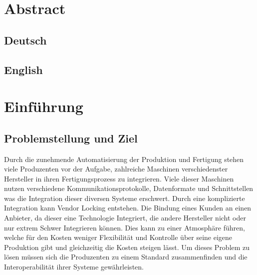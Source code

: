 \documentclass[a4paper, 12pt, oneside]{scrbook}
\begin{document}
	\frontmatter
	
	
	\tableofcontents
	\listoffigures
	\listoftables
	\nocite{*}

	\mainmatter
	
	\chapter*{Abstract}
	
	\section*{Deutsch}
	
	
	\section*{English}
	
	\pagebreak
	\chapter{Einführung}
	
	
	
	
	\section{Problemstellung und Ziel}
	
	
	 Durch die zunehmende Automatisierung der Produktion und Fertigung stehen viele Produzenten vor der Aufgabe, zahlreiche Maschinen verschiedenster Hersteller in ihren Fertigungsprozess zu integrieren. Viele dieser Maschinen nutzen verschiedene Kommunikationsprotokolle, Datenformate und Schnittstellen was die Integration dieser diversen Systeme erschwert. Durch eine komplizierte Integration kann Vendor Locking entstehen. Die Bindung eines Kunden an einen Anbieter, da dieser eine Technologie Integriert, die andere Hersteller nicht oder nur extrem Schwer Integrieren können. Dies kann zu einer Atmosphäre führen, welche für den Kosten weniger Flexibilität und Kontrolle über seine eigene Produktion gibt und gleichzeitig die Kosten steigen lässt. Um dieses Problem zu lösen müssen sich die Produzenten zu einem Standard zusammenfinden und die Interoperabilität ihrer Systeme gewährleisten.
	
\end{document}
